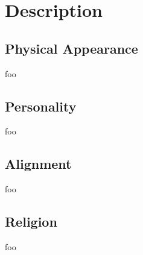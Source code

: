 \chapter{Description}
\section{Physical Appearance}
foo
\section{Personality}
foo
\section{Alignment}
foo
\section{Religion}
foo